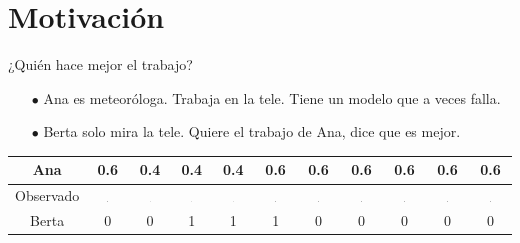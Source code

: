 \documentclass[shownotes]{beamer}
\begin{document}
\section{Motivaci\'on}
\small
\begin{frame}

 \begin{framed}
 \centering
  \normalsize ¿Qui\'en hace mejor el trabajo?
 \end{framed}

 
\begin{itemize}
\footnotesize
 \item[$\bullet$] Ana es meteor\'ologa. Trabaja en la tele. Tiene un modelo que a veces falla.
 \item[$\bullet$] Berta solo mira la tele. Quiere el trabajo de Ana, dice que es mejor.
\end{itemize} 

 \begin{table}[H]
\begin{tabular}{|c|c|c|c|c|c|c|c|c|c|c|}
\hline
 Ana & 0.6 & 0.4 & 0.4 & 0.4 & 0.6 & 0.6 & 0.6 & 0.6 & 0.6 & 0.6 \\ 
\hline \hline
 Observado & \includegraphics[width=0.02\textwidth]{imagenes/sol}  & \includegraphics[width=0.02\textwidth]{imagenes/lluvia} & \includegraphics[width=0.02\textwidth]{imagenes/lluvia} & \includegraphics[width=0.02\textwidth]{imagenes/lluvia} & \includegraphics[width=0.02\textwidth]{imagenes/sol} & \includegraphics[width=0.02\textwidth]{imagenes/sol} & \includegraphics[width=0.02\textwidth]{imagenes/sol} & \includegraphics[width=0.02\textwidth]{imagenes/sol} & \includegraphics[width=0.02\textwidth]{imagenes/sol} & \includegraphics[width=0.02\textwidth]{imagenes/sol} \\
\hline \hline
 Berta & 0 & 0 & 1 & 1 & 1 & 0 & 0 & 0 & 0 & 0   \\
 \hline
\end{tabular}
\end{table}


\end{frame}
\end{document}
